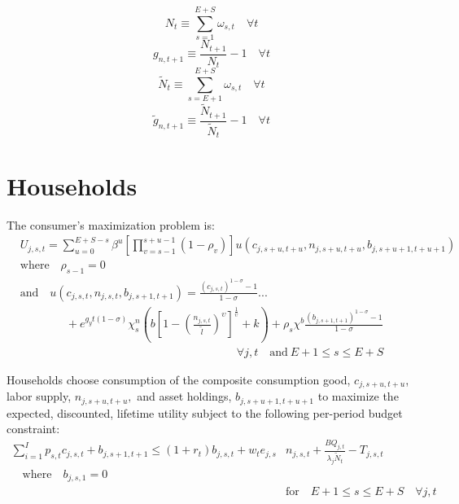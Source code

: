     \begin{equation}\label{EqPopDef}
      N_t\equiv\sum_{s=1}^{E+S} \omega_{s,t} \quad\forall t
    \end{equation}
    \begin{equation}\label{EqPopGrowth}
      g_{n,t+1} \equiv \frac{N_{t+1}}{N_t} - 1 \quad\forall t
    \end{equation}
    \begin{equation}\label{EqPopWkDef}
      \tilde{N}_t\equiv\sum_{s=E+1}^{E+S} \omega_{s,t} \quad\forall t
    \end{equation}
    \begin{equation}\label{EqPopWkGrowth}
      \tilde{g}_{n,t+1} \equiv \frac{\tilde{N}_{t+1}}{\tilde{N}_t} - 1 \quad\forall t
    \end{equation}


  \section{Households}
    The consumer's maximization problem is:
    \begin{equation}\label{EqUtilMax}
      \begin{split}
        &U_{j,s,t} = \sum_{u=0}^{E+S-s}\beta^u\left[\prod_{v=s-1}^{s+u-1}(1-\rho_v)\right] u\left(c_{j,s+u,t+u},n_{j,s+u,t+u},b_{j,s+u+1,t+u+1}\right) \\
        &\text{where}\quad \rho_{s-1}=0 \\
        &\text{and} \quad u\left(c_{j,s,t},n_{j,s,t},b_{j,s+1,t+1}\right) = \frac{\left(c_{j,s,t}\right)^{1-\sigma} - 1}{1-\sigma} ... \\
        &\qquad\qquad + e^{g_y t(1-\sigma)}\chi^n_s\left(b\left[1 - \left(\frac{n_{j,s,t}}{\tilde{l}}\right)^\upsilon\right]^\frac{1}{\upsilon} + k\right) + \rho_s\chi^b\frac{\left(b_{j,s+1,t+1}\right)^{1-\sigma} - 1}{1-\sigma} \\
        &\quad\quad\quad\quad\quad\quad\quad\quad\quad\quad\quad\quad\quad\quad\quad\quad\quad\quad\quad\forall j,t\quad\text{and}\:E+1\leq s\leq E+S
      \end{split}
    \end{equation}

    Households choose consumption of the composite consumption good, $c_{j,s+u,t+u}$, labor supply, $n_{j,s+u,t+u},$ and asset holdings, $b_{j,s+u+1,t+u+1}$ to maximize the expected, discounted, lifetime utility subject to the following per-period budget constraint:
    \begin{equation}\label{EqBC}
      \begin{split}
        \sum_{i=1}^I p_{s,t}c_{j,s,t} + b_{j,s+1,t+1} \leq \left(1 + r_t\right) b_{j,s,t} + w_t e_{j,s}&n_{j,s,t} + \frac{BQ_{j,t}}{\lambda_j\tilde{N}_t} - T_{j,s,t} \\
        \quad\text{where}\quad b_{j,s,1} = 0 \\
        &\text{for} \quad E+1\leq s \leq E+S \quad \forall j,t
      \end{split}
    \end{equation}

